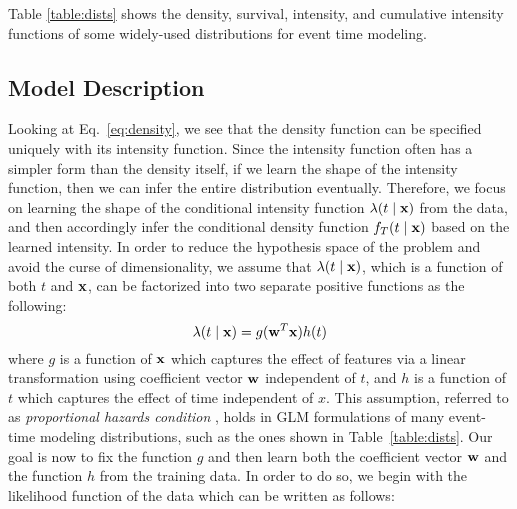 Table \ref{table:dists} shows the density, survival, intensity, and cumulative intensity functions of some widely-used distributions for event time modeling.

\subsection{Model Description}
Looking at Eq.~\ref{eq:density}, we see that the density function can be specified uniquely with its intensity function. Since the intensity function often has a simpler form than the density itself, if we learn the shape of the intensity function, then we can infer the entire distribution eventually. Therefore, we focus on learning the shape of the conditional intensity function $\lambda(t\mid \mathbf{x})$ from the data, and then accordingly infer the conditional density function $f_T(t\mid \mathbf{x})$ based on the learned intensity.
In order to reduce the hypothesis space of the problem and avoid the curse of dimensionality, we assume that $\lambda(t\mid \mathbf{x})$, which is a function of both $t$ and $\mathbf{x}$, can be factorized into two separate positive functions as the following:
\begin{equation}\label{eq:lambda}
\lambda(t\mid \mathbf{x})=g(\mathbf{w}^T\mathbf{x})h(t)
\end{equation}
where $g$ is a function of $\mathbf{x}$ which captures the effect of features via a linear transformation using coefficient vector $\mathbf{w}$ independent of $t$, and $h$ is a function of $t$ which captures the effect of time independent of $x$. This assumption, referred to as \emph{proportional hazards condition} \cite{breslow1975analysis}, holds in GLM formulations of many event-time modeling distributions, such as the ones shown in Table~\ref{table:dists}. Our goal is now to fix the function $g$ and then learn both the coefficient vector $\mathbf{w}$ and the function $h$ from the training data. In order to do so, we begin with the likelihood function of the data which can be written as follows:


